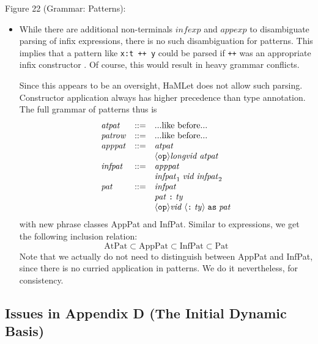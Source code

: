 \documentclass[twoside,titlepage]{article}
\begin{document}
\begin{appendix}
Figure 22 (Grammar: Patterns):

\begin{itemize}
\item While there are additional non-terminals $\mathit{infexp}$ and $\mathit{appexp}$ to disambiguate parsing of infix expressions, there is no such disambiguation for patterns. This implies that a pattern like {\tt x:t ++ y} could be parsed if {\tt ++} was an appropriate infix constructor \cite{addenda}. Of course, this would result in heavy grammar conflicts.

Since this appears to be an oversight, HaMLet does not allow such parsing. Constructor application always has higher precedence than type annotation. The full grammar of patterns thus is
%
\begin{displaymath}
\begin{array}{lcll}
\mathit{atpat} &::=& \mbox{...like before...} \\
\mathit{patrow} &::=& \mbox{...like before...} \\
\mathit{apppat} &::=& \mathit{atpat} \\
&& \langle{\tt{op}}\rangle \mathit{longvid} \; \mathit{atpat} \\
\mathit{infpat} &::=& \mathit{apppat} \\
&& \mathit{infpat}_1 \; \mathit{vid} \; \mathit{infpat}_2 \\
\mathit{pat} &::=& \mathit{infpat} \\
&& \mathit{pat} \; \mbox{\tt:} \; \mathit{ty} \\
&& \langle{\tt{op}}\rangle \mathit{vid} \; \langle\mbox{\tt:} \; \mathit{ty}\rangle
	\; {\tt as} \; \mathit{pat}
\end{array}
\end{displaymath}
%
with new phrase classes AppPat and InfPat. Similar to expressions, we get the following inclusion relation:
%
\begin{displaymath}
\mbox{AtPat} \subset \mbox{AppPat} \subset \mbox{InfPat} \subset \mbox{Pat}
\end{displaymath}
%
Note that we actually do not need to distinguish between AppPat and InfPat, since there is no curried application in patterns. We do it nevertheless, for consistency.

\end{itemize}


\subsection{Issues in Appendix D (The Initial Dynamic Basis)}
\label{bugsappendixd}


\end{appendix}
\end{document}
